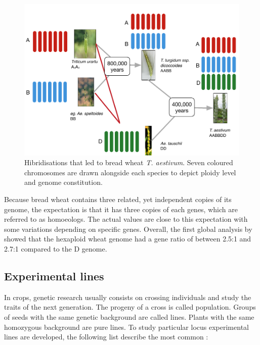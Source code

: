 \begin{figure}
  \includegraphics[width=1\textwidth]{LitReview/Figures/WheatPolyplodization.pdf}
  \caption{Hibridisations that led to bread wheat \textit{T. aestivum}. Seven coloured chromosomes are drawn alongside each species to depict ploidy level and genome constitution.  }
  \label{fig:lit:polyplody}
\end{figure}
Because bread wheat contains three related, yet independent copies of its genome, the expectation is that it has three copies of each genes, which are referred to as homoeologs.
The actual values are close to this expectation with some variations depending on specific genes.
Overall, the first global analysis by \citet{Brenchley2012} showed that the hexaploid wheat genome had a gene ratio of between 2.5:1 and 2.7:1 compared to the D genome.  




\subsection{Experimental lines}

In crops, genetic research usually consists on crossing individuals and study the traits of the next generation. 
The progeny of a cross is called population. 
Groups of seeds with the same genetic background are called lines. 
Plants with the same homozygous background are pure lines. 
To study particular locus experimental lines are developed, the following list describe the most common \citep{VanOoijen2013Intro}:

